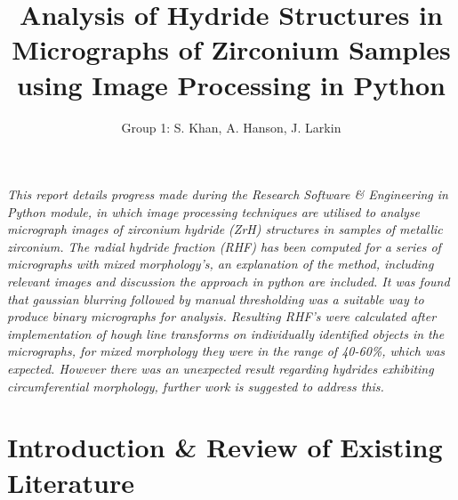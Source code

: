 \documentclass{article}
\title{Analysis of Hydride Structures in Micrographs of Zirconium Samples using Image Processing in Python}
\author{Group 1: S. Khan, A. Hanson, J. Larkin}
\begin{document}
	\maketitle
	
	\begin{center} \textit{This report details progress made during the Research Software \& Engineering in Python module, in which image processing techniques are utilised to analyse micrograph images of zirconium hydride (ZrH) structures in samples of metallic zirconium. The radial hydride fraction (RHF) has been computed for a series of micrographs with mixed morphology's, an explanation of the method, including relevant images and discussion the approach in python are included. It was found that gaussian blurring followed by manual thresholding was a suitable way to produce binary micrographs for analysis. Resulting RHF's were calculated after implementation of hough line transforms on individually identified objects in the micrographs, for mixed morphology they were in the range of 40-60\%, which was expected. However there was an unexpected result regarding hydrides exhibiting circumferential morphology, further work is suggested to address this.} \end{center}

\newpage
\tableofcontents
\newpage
	\section{Introduction \& Review of Existing Literature}
\end{document}
